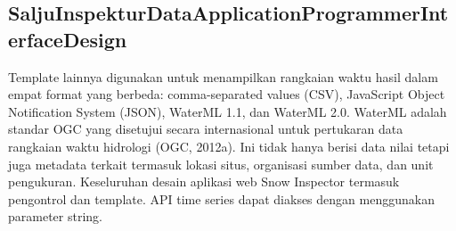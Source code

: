 \cite{Kadlec2016Extracting}

\subsection{SaljuInspekturDataApplicationProgrammerInterfaceDesign}

Template lainnya digunakan untuk menampilkan rangkaian waktu hasil dalam empat format yang berbeda: comma-separated values ​​(CSV), JavaScript Object Notification System (JSON), WaterML 1.1, dan WaterML 2.0. WaterML adalah standar OGC yang disetujui secara internasional untuk pertukaran data rangkaian waktu hidrologi (OGC, 2012a). Ini tidak hanya berisi data nilai tetapi juga metadata terkait termasuk lokasi situs, organisasi sumber data, dan unit pengukuran. Keseluruhan desain aplikasi web Snow Inspector termasuk pengontrol dan template. API time series dapat diakses dengan menggunakan parameter string.

\cite{Kadlec2016Extracting}

